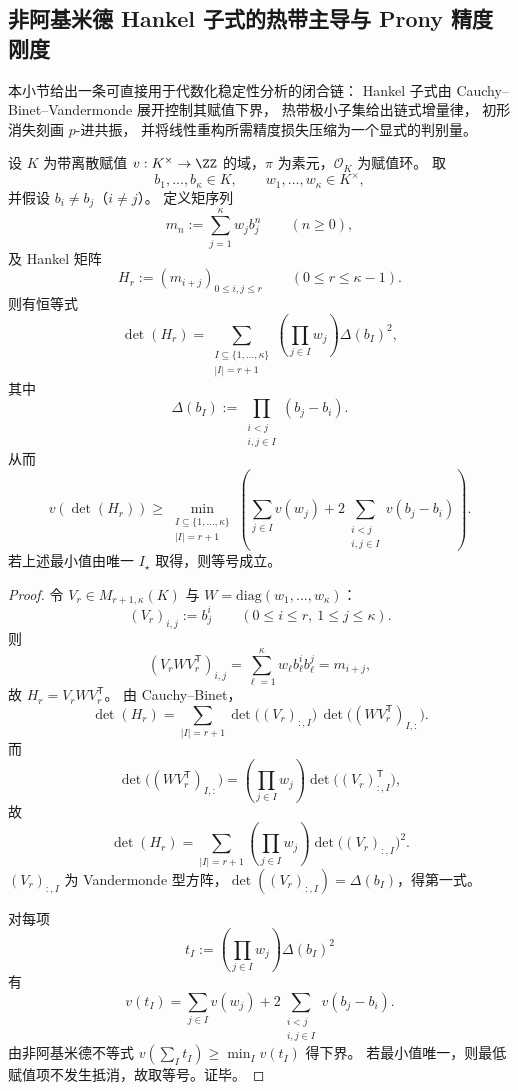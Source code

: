 \subsection{非阿基米德 Hankel 子式的热带主导与 Prony 精度刚度}\label{subsec:conclusion-nonarchimedean-hankel-tropical-prony-rigidity}
本小节给出一条可直接用于代数化稳定性分析的闭合链：
Hankel 子式由 Cauchy--Binet--Vandermonde 展开控制其赋值下界，
热带极小子集给出链式增量律，
初形消失刻画 \(p\)-进共振，
并将线性重构所需精度损失压缩为一个显式的判别量。

\begin{theorem}\label{thm:conclusion-nonarch-hankel-cauchy-binet-vandermonde}
设 \(K\) 为带离散赋值 \(v:K^\times\to\ZZ\) 的域，\(\pi\) 为素元，\(\mathcal O_K\) 为赋值环。
取
\[
b_1,\dots,b_\kappa\in K,\qquad
w_1,\dots,w_\kappa\in K^\times,
\]
并假设 \(b_i\neq b_j\)（\(i\neq j\)）。
定义矩序列
\[
m_n:=\sum_{j=1}^{\kappa}w_j b_j^n\qquad(n\ge 0),
\]
及 Hankel 矩阵
\[
H_r:=(m_{i+j})_{0\le i,j\le r}\qquad(0\le r\le \kappa-1).
\]
则有恒等式
\[
\det(H_r)
=
\sum_{\substack{I\subseteq\{1,\dots,\kappa\}\\ |I|=r+1}}
\left(\prod_{j\in I}w_j\right)\Delta(b_I)^2,
\]
其中
\[
\Delta(b_I):=\prod_{\substack{i<j\\ i,j\in I}}(b_j-b_i).
\]
从而
\[
v(\det(H_r))
\ge
\min_{\substack{I\subseteq\{1,\dots,\kappa\}\\ |I|=r+1}}
\left(
\sum_{j\in I}v(w_j)
+
2\!\!\sum_{\substack{i<j\\ i,j\in I}}v(b_j-b_i)
\right).
\]
若上述最小值由唯一 \(I_\star\) 取得，则等号成立。
\end{theorem}
\begin{proof}
令 \(V_r\in M_{r+1,\kappa}(K)\) 与 \(W=\mathrm{diag}(w_1,\dots,w_\kappa)\)：
\[
(V_r)_{i,j}:=b_j^i\qquad(0\le i\le r,\ 1\le j\le \kappa).
\]
则
\[
(V_r W V_r^{\mathsf T})_{i,j}
=
\sum_{\ell=1}^{\kappa}w_\ell b_\ell^i b_\ell^j
=m_{i+j},
\]
故 \(H_r=V_r W V_r^{\mathsf T}\)。
由 Cauchy--Binet，
\[
\det(H_r)
=
\sum_{|I|=r+1}
\det\!\bigl((V_r)_{:,I}\bigr)\,
\det\!\bigl((W V_r^{\mathsf T})_{I,:}\bigr).
\]
而
\[
\det\!\bigl((W V_r^{\mathsf T})_{I,:}\bigr)
=
\left(\prod_{j\in I}w_j\right)\det\!\bigl((V_r)_{:,I}^{\mathsf T}\bigr),
\]
故
\[
\det(H_r)
=
\sum_{|I|=r+1}
\left(\prod_{j\in I}w_j\right)\det\!\bigl((V_r)_{:,I}\bigr)^2.
\]
\((V_r)_{:,I}\) 为 Vandermonde 型方阵，\(\det((V_r)_{:,I})=\Delta(b_I)\)，得第一式。

对每项
\[
t_I:=\left(\prod_{j\in I}w_j\right)\Delta(b_I)^2
\]
有
\[
v(t_I)=\sum_{j\in I}v(w_j)+2\!\!\sum_{\substack{i<j\\ i,j\in I}}v(b_j-b_i).
\]
由非阿基米德不等式 \(v(\sum_I t_I)\ge \min_I v(t_I)\) 得下界。
若最小值唯一，则最低赋值项不发生抵消，故取等号。证毕。
\end{proof}

